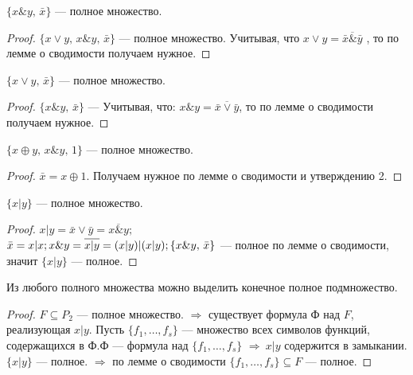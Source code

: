 \begin{statement}
$	\{x\&y,\, \bar{x} \}$ --- полное множество. 
\end{statement}
\begin{proof}
			$\{x\vee y,\, x \& y,\, \bar{x} \}$ --- полное множество. Учитывая, что $x \vee y = \overline{\bar{x}\&\bar{y} } $ , то по лемме о сводимости получаем нужное. \end{proof}	
\begin{statement}
	$\{x \vee y,\, \bar{x} \}$ --- полное множество.  
\end{statement}
\begin{proof}
	$	\{x\&y,\, \bar{x} \}$ ---   Учитывая, что: $x \& y =  \overline{\bar{x}\vee\bar{y} }$, то по лемме о сводимости получаем нужное.
\end{proof}
\begin{statement} 
$\{x \oplus y,\, x \& y,\, 1\}$ --- полное множество.
\end{statement}
\begin{proof}
	$\bar{x}=x \oplus 1. $ Получаем нужное по лемме о сводимости и утверждению 2.
\end{proof}	
\begin{statement}
	$\{x | y\}$ --- полное множество. 
\end{statement}
\begin{proof}
	$x|y=\bar{x} \vee \bar{y}=\overline{x \& y};$ \\
	$\bar{x}=x | x; \\
	x \& y=\overline{x|y}=(x|y)|(x|y); \\
	\{x \& y,\, \bar{x}\}$ --- полное по лемме о сводимости, значит $\{x|y\}$ --- полное.   
\end{proof}
\begin{corollary}
	Из любого полного множества можно выделить конечное полное подмножество.
\end{corollary}
\begin{proof}
	$F\subseteq P_2$ --- полное множество. $\Rightarrow$ существует формула Ф над $F$, реализующая ${x|y}$. Пусть $\{f_1, \ldots, f_s\}$ --- множество всех символов функций, содержащихся в Ф.Ф --- формула над $\{f_1, \ldots, f_s\}$ $\Rightarrow  ~ x|y$ содержится в замыкании. $\{x|y\}$ --- полное. $\Rightarrow$ по лемме о сводимости $\{f_1, \ldots, f_s\} \subseteq F$ --- полное.
\end{proof}  


